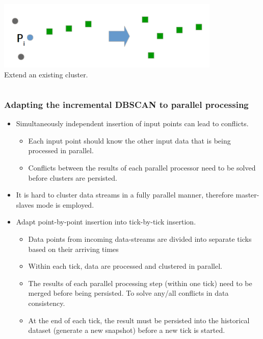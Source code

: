 \begin{frame}
\begin{columns}
            \centering
            \includegraphics[width=0.8\textwidth]{resource/figures/condition4.png}
            \\ \tiny Extend an existing cluster.
    \end{columns}
\end{frame}

\begin{frame}
    \frametitle{Adapting the incremental DBSCAN to parallel processing}
    \begin{itemize}
        \item Simultaneously independent insertion of input points can lead to conflicts.
        \begin{itemize}
	        \item \small Each input point should know the other input data that is being processed in parallel.
	        \item \small Conflicts between the results of each parallel processor need to be solved before clusters are persisted.
        \end{itemize}
        \item It is hard to cluster data streams in a fully parallel manner, therefore master-slaves mode is employed.
        \item Adapt point-by-point insertion into tick-by-tick insertion.
        \begin{itemize}
            \item \tiny Data points from incoming data-streams are divided into separate ticks based on their arriving times
            \item \tiny Within each tick, data are processed and clustered in parallel.
            \item \tiny The results of each parallel processing step (within one tick) need to be merged before being persisted. To solve any/all conflicts in data consistency.
            \item \tiny At the end of each tick, the result must be persisted into the historical dataset (generate a new snapshot) before a new tick is started.
        \end{itemize}
    \end{itemize}
\end{frame}


